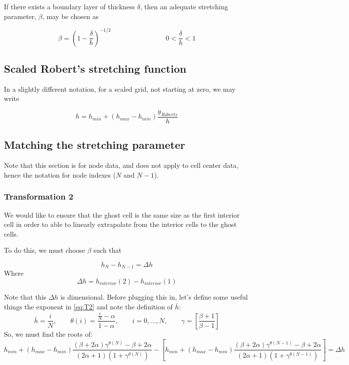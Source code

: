 \documentclass[11pt]{article}
\newcommand{\gammadef}{\left[\frac{\beta+1}{\beta-1}\right]}
\newcommand{\g}{\gamma}
\begin{document}
If there exists a boundary layer of thickness $\delta$, then an adequate stretching parameter, $\beta$, may be chosen as

\begin{equation}
	\beta = \left( 1 - \frac{\delta}{h} \right)^{-1/2}
	\qquad \qquad
	\qquad \qquad
	0 < \frac{\delta}{h} < 1
\end{equation}


\subsection{Scaled Robert's stretching function}
In a slightly different notation, for a scaled grid, not starting at zero, we may write

\begin{equation}
	h = h_{min} + (h_{max}-h_{min}) \frac{y_{Roberts}}{h}
\end{equation}

\subsection{Matching the stretching parameter}
Note that this section is for node data, and does not apply to cell center data, hence the notation for node indexes ($N$ and $N-1$).

\subsubsection{Transformation 2}
We would like to ensure that the ghost cell is the same size as the first interior cell in order to able to linearly extrapolate from the interior cells to the ghost cells.

To do this, we must choose $\beta$ such that

\begin{equation}
	h_{N} - h_{N-1} = \Delta h
\end{equation}
Where
\begin{equation}
	\Delta h = h_{interior}(2) - h_{interior}(1)
\end{equation}

Note that this $\Delta h$ is dimensional. Before plugging this in, let's define some useful things the exponent in \ref{eq:T2} and note the definition of $\bar{h}$:
\begin{equation}
	\bar{h} = \frac{i}{N}, \qquad 
	\theta(i) = \frac{\frac{i}{N} - \alpha}{1 - \alpha}, 
	\qquad i=0,...,N,
	\qquad \g = \gammadef
\end{equation}
So, we must find the roots of:
\begin{equation}
	h_{min} + (h_{max}-h_{min}) \frac{(\beta+2\alpha)\g^{\theta(N)} - \beta + 2\alpha}{(2\alpha+1)\left(1+\g^{\theta(N)} \right)}
	-
	\left[
	h_{min} + (h_{max}-h_{min}) \frac{(\beta+2\alpha)\g^{\theta(N-1)} - \beta + 2\alpha}{(2\alpha+1)\left(1+\g^{\theta(N-1)} \right)}
	\right]
	=
	\Delta h
\end{equation}
\end{document}
